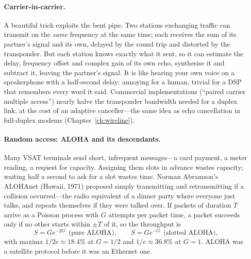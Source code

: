 \paragraph{Carrier-in-carrier.} A beautiful trick exploits the bent pipe. Two stations exchanging
traffic can transmit on the \emph{same} frequency at the same time; each receives the sum of its
partner's signal and its own, delayed by the round trip and distorted by the transponder. But each
station knows exactly what it sent, so it can estimate the delay, frequency offset and complex gain
of its own echo, synthesise it and subtract it, leaving the partner's signal. It is like hearing
your own voice on a speakerphone with a half-second delay: annoying for a human, trivial for a DSP
that remembers every word it said. Commercial implementations (``paired carrier multiple access'')
nearly halve the transponder bandwidth needed for a duplex link, at the cost of an adaptive
canceller---the same idea as echo cancellation in full-duplex modems (Chapter~\ref{ch:wireline}).

\paragraph{Random access: ALOHA and its descendants.} Many VSAT terminals send short, infrequent
messages---a card payment, a meter reading, a request for capacity. Assigning them slots in advance
wastes capacity; waiting half a second to ask for a slot wastes time. Norman Abramson's ALOHAnet
(Hawaii, 1971) proposed simply transmitting and retransmitting if a collision occurred---the
radio equivalent of a dinner party where everyone just talks, and repeats themselves if they were
talked over. If packets of duration $T$ arrive as a Poisson process with $G$ attempts per packet
time, a packet succeeds only if no other starts within $\pm T$ of it, so the throughput is
\begin{equation}
S=Ge^{-2G}\ \ \text{(pure ALOHA)},\qquad S=Ge^{-G}\ \ \text{(slotted ALOHA)},
\label{eq:ch23:aloha}
\end{equation}
with maxima $1/2e\approx18.4\%$ at $G=1/2$ and $1/e\approx36.8\%$ at $G=1$. ALOHA was a satellite
protocol before it was an Ethernet one.


